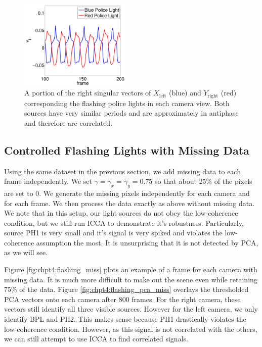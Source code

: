 \begin{figure}
  \begin{center}
      \includegraphics[width=0.47\textwidth]{chpt4_det_corr/figs/flashing_v.pdf}
    \caption{A portion of the right singular vectors of $X_{\text{left}}$ (blue) and
      $Y_{\text{right}}$ (red) corresponding the flashing police lights in each camera
      view. Both sources have very similar periods and are approximately in antiphase and
      therefore are correlated. }
    \label{fig:chpt4:flashing_v}
  \end{center}
\end{figure}

\subsection{Controlled Flashing Lights with Missing Data}

Using the same dataset in the previous section, we add missing data to each frame
independently. We set $\gamma=\gamma_x=\gamma_y=0.75$ so that about 25\% of the pixels are
set to 0. We generate the missing pixels independently for each camera and for each
frame. We then process the data exactly as above without missing data. We note that in
this setup, our light sources do not obey the low-coherence condition, but we still run
ICCA to demonstrate it's robustness. Particularly, source PH1 is very small and it's
signal is very spiked and violates the low-coherence assumption the most. It is
unsurprising that it is not detected by PCA, as we will see.

Figure \ref{fig:chpt4:flashing_miss} plots an example of a frame for each camera with
missing data. It is much more difficult to make out the scene even while retaining 75\% of
the data. Figure \ref{fig:chpt4:flashing_pca_miss} overlays the thresholded PCA vectors
onto each camera after 800 frames. For the right camera, these vectors still identify all
three visible sources. However for the left camera, we only identify BPL and PH2. This
makes sense because PH1 drastically violates the low-coherence condition. However, as this
signal is not correlated with the others, we can still attempt to use ICCA to find
correlated signals.

